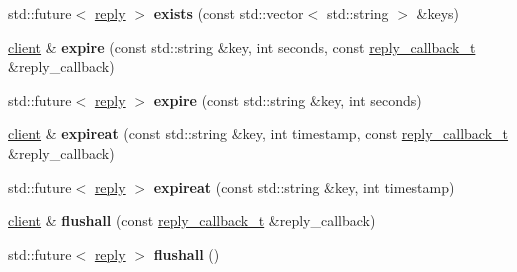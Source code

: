 \begin{DoxyCompactItemize}
\mbox{\label{classcpp__redis_1_1client_a16ab72e15bd14a3fd2eb97194cea3d2d}} 
std\+::future$<$ \mbox{\hyperlink{classcpp__redis_1_1reply}{reply}} $>$ {\bfseries exists} (const std\+::vector$<$ std\+::string $>$ \&keys)
\item 
\mbox{\label{classcpp__redis_1_1client_ab2c50e9f37a4e6a5dff059c991dbd15e}} 
\mbox{\hyperlink{classcpp__redis_1_1client}{client}} \& {\bfseries expire} (const std\+::string \&key, int seconds, const \mbox{\hyperlink{classcpp__redis_1_1client_af7a65eb21aa25230bfbb0b0203c4fc04}{reply\+\_\+callback\+\_\+t}} \&reply\+\_\+callback)
\item 
\mbox{\label{classcpp__redis_1_1client_aeb2f8b475d5adf23a25ae066e1ff45f4}} 
std\+::future$<$ \mbox{\hyperlink{classcpp__redis_1_1reply}{reply}} $>$ {\bfseries expire} (const std\+::string \&key, int seconds)
\item 
\mbox{\label{classcpp__redis_1_1client_a7b5e1b089d68a0cb71f72fb6aecb0a63}} 
\mbox{\hyperlink{classcpp__redis_1_1client}{client}} \& {\bfseries expireat} (const std\+::string \&key, int timestamp, const \mbox{\hyperlink{classcpp__redis_1_1client_af7a65eb21aa25230bfbb0b0203c4fc04}{reply\+\_\+callback\+\_\+t}} \&reply\+\_\+callback)
\item 
\mbox{\label{classcpp__redis_1_1client_af344a8ae784f7d4d529ea9cab276906c}} 
std\+::future$<$ \mbox{\hyperlink{classcpp__redis_1_1reply}{reply}} $>$ {\bfseries expireat} (const std\+::string \&key, int timestamp)
\item 
\mbox{\label{classcpp__redis_1_1client_a64e5730ff850ce517709e4e7fc511309}} 
\mbox{\hyperlink{classcpp__redis_1_1client}{client}} \& {\bfseries flushall} (const \mbox{\hyperlink{classcpp__redis_1_1client_af7a65eb21aa25230bfbb0b0203c4fc04}{reply\+\_\+callback\+\_\+t}} \&reply\+\_\+callback)
\item 
\mbox{\label{classcpp__redis_1_1client_a78f879507f060ba538de5db80a5e3009}} 
std\+::future$<$ \mbox{\hyperlink{classcpp__redis_1_1reply}{reply}} $>$ {\bfseries flushall} ()
\item 
\mbox{\label{classcpp__redis_1_1client_a8334064cd300cb19f0760ad7c4c84673}} 

\end{DoxyCompactItemize}
